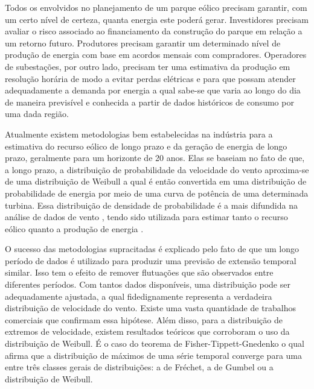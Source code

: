 \documentclass[
	12pt,				%
	openright,			%
	oneside,			%
	a4paper,			%
	english,			%
	french,				%
	spanish,			%
	brazil				%
	]{abntex2}
\begin{document}
\setlength{\absparsep}{18pt} %
\begin{resumo}
Todos os envolvidos no planejamento de um parque eólico precisam garantir, com um certo nível de certeza, quanta energia este poderá gerar. Investidores precisam avaliar o risco associado ao financiamento da construção do parque em relação a um retorno futuro. Produtores precisam garantir um determinado nível de produção de energia com base em acordos mensais com compradores. Operadores de subestações, por outro lado, precisam ter uma estimativa da produção em resolução horária de modo a evitar perdas elétricas e para que possam atender adequadamente a demanda por energia a qual sabe-se que varia ao longo do dia de maneira previsível e conhecida a partir de dados históricos de consumo por uma dada região.

Atualmente existem metodologias bem estabelecidas na indústria para a estimativa do recurso eólico de longo prazo e da geração de energia de longo prazo, geralmente para um horizonte de 20 anos. Elas se baseiam no fato de que, a longo prazo, a distribuição de probabilidade da velocidade do vento aproxima-se de uma distribuição de Weibull \cite{weibull} a qual é então convertida em uma distribuição de probabilidade de energia por meio de uma curva de potência de uma determinada turbina. Essa distribuição de densidade de probabilidade é a mais difundida na análise de dados de vento \cite{art13},  tendo sido utilizada para estimar tanto o recurso eólico \cite{art14} quanto a produção de energia \cite{art15}.

O sucesso das metodologias supracitadas é explicado pelo fato de que um longo período de dados é utilizado para produzir uma previsão de extensão temporal similar. Isso tem o efeito de remover flutuações que são observados entre diferentes períodos. Com tantos dados disponíveis, uma distribuição pode ser adequadamente ajustada, a qual fidedignamente representa a verdadeira distribuição de velocidade do vento. Existe uma vasta quantidade de trabalhos comerciais que confirmam essa hipótese. Além disso, para a distribuição de extremos de velocidade, existem resultados teóricos que corroboram o uso da distribuição de Weibull. É o caso do teorema de Fisher-Tippett-Gnedenko \cite{Basrak2011} o qual afirma que a distribuição de máximos de uma série temporal converge para uma entre três classes gerais de distribuições: a de Fréchet, a de Gumbel ou a distribuição de Weibull.


\end{resumo}
\end{document}

